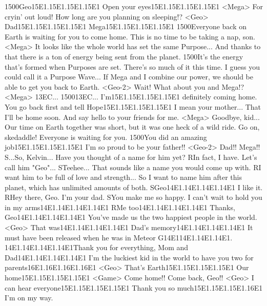 {15}{00}Geo{15}{E1}.{15}{E1}.{15}{E1}.{15}{E1} 
Open your eyes{15}{E1}.{15}{E1}.{15}{E1}.{15}{E1} 
<Mega> For cryin' out loud! How long are you planning on sleeping!? 
<Geo> Dad{15}{E1}.{15}{E1}.{15}{E1}.{15}{E1} 
Mega{15}{E1}.{15}{E1}.{15}{E1}.{15}{E1} 
{15}{00}Everyone back on Earth is waiting for you to come home. 
This is no time to be taking a nap, son. 
<Mega> It looks like the whole world has set the same Purpose... 
And thanks to that there is a ton of energy being sent from the planet. 
{15}{00}It's the energy that's formed when Purposes are set. 
There's so much of it this time. I guess you could call it a Purpose Wave... 
If Mega and I combine our power, we should be able to get you back to Earth. 
<Geo-2> Wait! 
What about you and Mega!? 
<Mega> {13}{EC}... 
{15}{00}{13}{EC}... 
I'm{15}{E1}.{15}{E1}.{15}{E1}.{15}{E1} definitely coming home. 
You go back first and tell Hope{15}{E1}.{15}{E1}.{15}{E1}.{15}{E1} I mean your mother... That I'll be home soon. 
And say hello to your friends for me. 
<Mega> Goodbye, kid... 
Our time on Earth together was short, but it was one heck of a wild ride. 
Go on, skedaddle! 
Everyone is waiting for you. 
{15}{00}You did an amazing job{15}{E1}.{15}{E1}.{15}{E1}.{15}{E1} 
I'm so proud to be your father!! 
<Geo-2> Dad!! Mega!! 
S...So, Kelvin... 
Have you thought of a name for him yet? 
RIn fact, I have. 
Let's call him "Geo"... 
STeehee... That sounds like a name you would come up with. 
RI want him to be full of love and strength... 
So I want to name him after this planet, which has unlimited amounts of both. 
SGeo{14}{E1}.{14}{E1}.{14}{E1}.{14}{E1} 
I like it. 
RHey there, Geo. I'm your dad. 
SYou make me so happy. 
I can't wait to hold you in my arms{14}{E1}.{14}{E1}.{14}{E1}.{14}{E1} 
RMe too{14}{E1}.{14}{E1}.{14}{E1}.{14}{E1} Thanks, Geo{14}{E1}.{14}{E1}.{14}{E1}.{14}{E1} 
You've made us the two happiest people in the world. 
<Geo> That was{14}{E1}.{14}{E1}.{14}{E1}.{14}{E1} Dad's memory{14}{E1}.{14}{E1}.{14}{E1}.{14}{E1} 
It must have been released when he was in Meteor G{14}{E1}{14}{E1}.{14}{E1}.{14}{E1}. 
{14}{E1}.{14}{E1}.{14}{E1}.{14}{E1}Thank you for everything, Mom and Dad{14}{E1}.{14}{E1}.{14}{E1}.{14}{E1} 
I'm the luckiest kid in the world to have you two for parents{16}{E1}.{16}{E1}.{16}{E1}.{16}{E1} 
<Geo> That's Earth{15}{E1}.{15}{E1}.{15}{E1}.{15}{E1} 
Our home{15}{E1}.{15}{E1}.{15}{E1}.{15}{E1} 
<Game> Come home!! 
Come back, Geo!! 
<Geo> I can hear everyone{15}{E1}.{15}{E1}.{15}{E1}.{15}{E1} 
Thank you so much{15}{E1}.{15}{E1}.{15}{E1}.{16}{E1} 
I'm on my way. 
